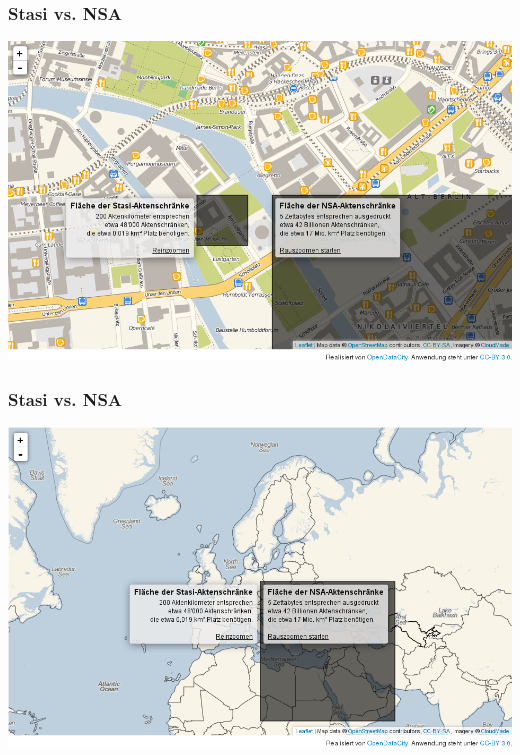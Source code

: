 \documentclass[12pt]{beamer}
\begin{document}
\begin{frame}
    \frametitle{Stasi vs. NSA}
    \includegraphics[height=0.7\textheight]{img/akten1.png}
\end{frame}

\begin{frame}
    \frametitle{Stasi vs. NSA}
    \includegraphics[height=0.7\textheight]{img/akten2.png}
\end{frame}
\end{document}
